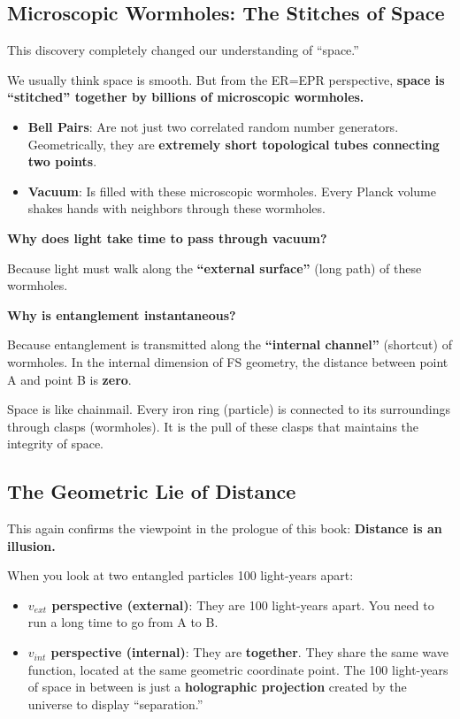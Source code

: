 \subsection{Microscopic Wormholes: The Stitches of Space}

This discovery completely changed our understanding of ``space.''

We usually think space is smooth. But from the ER=EPR perspective, \textbf{space is ``stitched'' together by billions of microscopic wormholes.}

\begin{itemize}
\item \textbf{Bell Pairs}: Are not just two correlated random number generators. Geometrically, they are \textbf{extremely short topological tubes connecting two points}.

\item \textbf{Vacuum}: Is filled with these microscopic wormholes. Every Planck volume shakes hands with neighbors through these wormholes.
\end{itemize}

\textbf{Why does light take time to pass through vacuum?}

Because light must walk along the \textbf{``external surface''} (long path) of these wormholes.

\textbf{Why is entanglement instantaneous?}

Because entanglement is transmitted along the \textbf{``internal channel''} (shortcut) of wormholes. In the internal dimension of FS geometry, the distance between point A and point B is \textbf{zero}.

Space is like chainmail. Every iron ring (particle) is connected to its surroundings through clasps (wormholes). It is the pull of these clasps that maintains the integrity of space.

\subsection{The Geometric Lie of Distance}

This again confirms the viewpoint in the prologue of this book: \textbf{Distance is an illusion.}

When you look at two entangled particles 100 light-years apart:

\begin{itemize}
\item \textbf{$v_{ext}$ perspective (external)}: They are 100 light-years apart. You need to run a long time to go from A to B.

\item \textbf{$v_{int}$ perspective (internal)}: They are \textbf{together}. They share the same wave function, located at the same geometric coordinate point. The 100 light-years of space in between is just a \textbf{holographic projection} created by the universe to display ``separation.''
\end{itemize}

